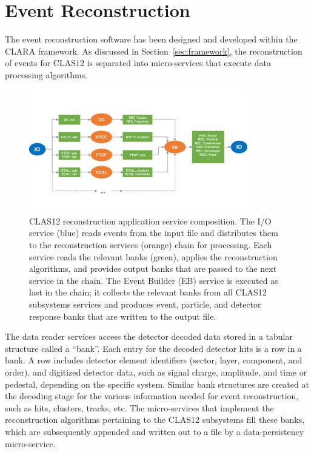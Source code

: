\section{Event Reconstruction}
\label{sec:recon}

The event reconstruction software has been designed and developed within the CLARA framework. As discussed
in Section~\ref{sec:framework}, the reconstruction of events for CLAS12 is separated into micro-services that
execute data processing algorithms.

\begin{figure}
\centering
\includegraphics[width=0.85\textwidth]{pics/ServiceComposition.pdf}
\caption{CLAS12 reconstruction application service composition. The I/O service (blue) reads events from the
  input file and distributes them to the reconstruction services (orange) chain for processing. Each service reads
  the relevant banks (green), applies the reconstruction algorithms, and provides output banks that are passed to
  the next service in the chain. The Event Builder (EB) service is executed as last in the chain; it collects the relevant
  banks from all CLAS12 subsystems services and produces event, particle, and detector response banks that are
  written to the output file.}
\label{fig:services}
\end{figure}

The data reader services access the detector decoded data stored in a tabular structure called a ``bank''.
Each entry for the decoded detector hits is a row in a bank. A row includes detector element identifiers (sector,
layer, component, and order), and digitized detector data, such as signal charge, amplitude, and time or pedestal,
depending on the specific system. Similar bank structures are created at the decoding stage for the various
information needed for event reconstruction, such as hits, clusters, tracks, etc. The micro-services that
implement the reconstruction algorithms pertaining to the CLAS12 subsystems fill these banks, which are
subsequently appended and written out to a file by a data-persistency micro-service.

